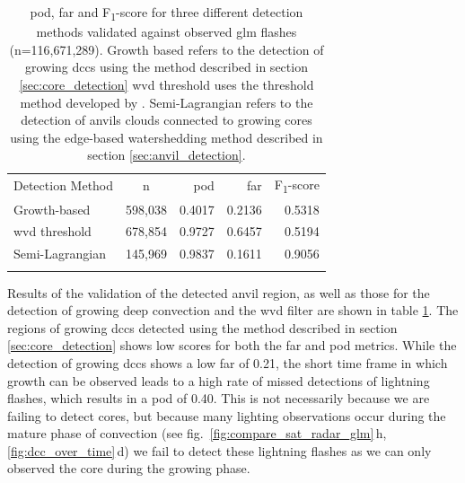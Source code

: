 \begin{table}[tb]
\centering
\begin{tabular}{lcrrr}
\tophline
Detection Method            & n         & \acrshort{pod}    & \acrshort{far}    & F\textsubscript{1}-score \\ 
\middlehline
Growth-based                & 598,038   & 0.4017            & 0.2136            & 0.5318  \\
\acrshort{wvd} threshold    & 678,854   & 0.9727            & 0.6457            & 0.5194  \\
Semi-Lagrangian             & 145,969   & 0.9837            & 0.1611            & 0.9056 \\
\bottomhline
\end{tabular}
\caption[
\acrshort{pod}, \acrshort{far} and F\textsubscript{1}-score for three different detection methods validated against observed \acrshort{glm} flashes
]{
\acrshort{pod}, \acrshort{far} and F\textsubscript{1}-score for three different detection methods validated against observed \acrshort{glm} flashes (n=116,671,289). Growth based refers to the detection of growing \acrshort{dcc}s using the method described in section \ref{sec:core_detection} \acrshort{wvd} threshold uses the threshold method developed by \citet{muller_role_2018}. Semi-Lagrangian refers to the detection of anvils clouds connected to growing cores using the edge-based watershedding method described in section \ref{sec:anvil_detection}.
} %
\label{table:validation}
\end{table}


Results of the validation of the detected anvil region, as well as those for the detection of growing deep convection and the \acrshort{wvd} filter are shown in table \ref{table:validation}.
The regions of growing \acrshort{dcc}s detected using the method described in section \ref{sec:core_detection} shows low scores for both the \acrshort{far} and \acrshort{pod} metrics.
While the detection of growing \acrshort{dcc}s shows a low \acrshort{far} of 0.21, the short time frame in which growth can be observed leads to a high rate of missed detections of lightning flashes, which results in a \acrshort{pod} of 0.40.
This is not necessarily because we are failing to detect cores, but because many lighting observations occur during the mature phase of convection (see fig.~\ref{fig:compare_sat_radar_glm}\,h, \ref{fig:dcc_over_time}\,d) we fail to detect these lightning flashes as we can only observed the core during the growing phase.

